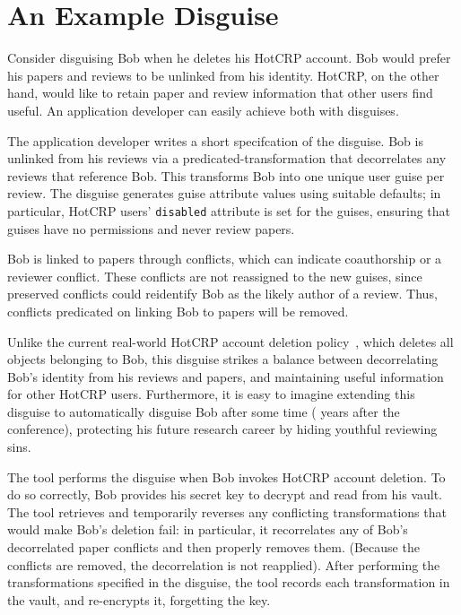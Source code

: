 \section{An Example Disguise}
\label{design:eg}
%
Consider disguising Bob when he deletes his HotCRP account.
%
Bob would prefer his papers and reviews to be unlinked from his identity.
%
HotCRP, on the other hand, would like to retain paper and review information that other users
find useful.
%
An application developer can easily achieve both with disguises.
%

The application developer writes a short specifcation of the disguise. Bob is unlinked from his
reviews via a predicated-transformation that decorrelates any reviews that reference Bob.
%
This transforms Bob into one unique user guise per review.
%
The disguise generates guise attribute values using suitable defaults;
%
in particular, HotCRP users' \texttt{disabled} attribute is set for the guises, ensuring that guises
have no permissions and never review papers.
%

%
Bob is linked to papers through conflicts, which can indicate coauthorship or a reviewer conflict.
%
These conflicts are not reassigned to the new guises, since preserved conflicts could reidentify Bob
as the likely author of a review. Thus, conflicts predicated on linking Bob to papers will be
removed.

Unlike the current real-world HotCRP account deletion policy~\cite{hotcrp:privacy}, which deletes
all objects belonging to Bob, this disguise strikes a balance between decorrelating Bob's identity
from his reviews and papers, and maintaining useful information for other HotCRP users.
%
Furthermore, it is easy to imagine extending this disguise to automatically disguise Bob after some
time ( years after the conference), protecting his future research career by hiding youthful
reviewing sins.
%

The tool performs the disguise when Bob invokes HotCRP account deletion. To do so correctly, Bob
provides his secret key to decrypt and read from his vault. The tool retrieves and temporarily reverses any conflicting
transformations that would make Bob's deletion fail: in particular, it recorrelates any of Bob's decorrelated
paper conflicts and then properly removes them. (Because the conflicts are removed, the
decorrelation is not reapplied). After performing the transformations specified in the disguise, the
tool records each transformation in the vault, and re-encrypts it, forgetting the key.
